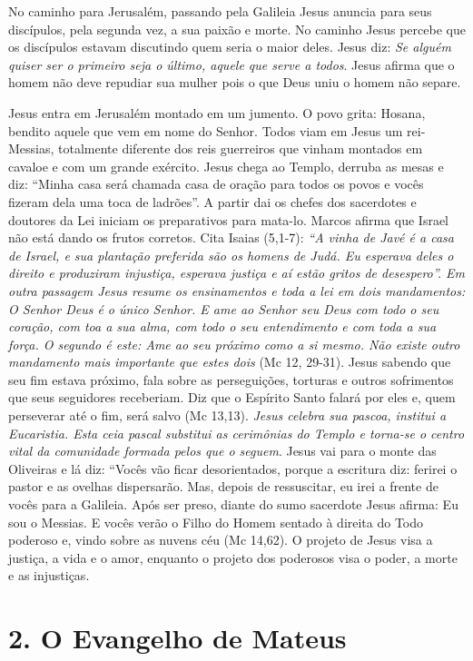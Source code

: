 \documentclass[
]{book}
\begin{document}
No caminho para Jerusalém, passando pela Galileia Jesus anuncia para seus discípulos, pela segunda vez, a sua paixão e morte. No caminho Jesus percebe que os discípulos estavam discutindo quem seria o maior deles. Jesus diz: \emph{Se alguém quiser ser o primeiro seja o último, aquele que serve a todos}. Jesus afirma que o homem não deve repudiar sua mulher pois o que Deus uniu o homem não separe.

Jesus entra em Jerusalém montado em um jumento. O povo grita: Hosana, bendito aquele que vem em nome do Senhor. Todos viam em Jesus um rei-Messias, totalmente diferente dos reis guerreiros que vinham montados em cavaloe e com um grande exército. Jesus chega ao Templo, derruba as mesas e diz: ``Minha casa será chamada casa de oração para todos os povos e vocês fizeram dela uma toca de ladrões''. A partir dai os chefes dos sacerdotes e doutores da Lei iniciam os preparativos para mata-lo. Marcos afirma que Israel não está dando os frutos corretos. Cita Isaias (5,1-7): \emph{``A vinha de Javé é a casa de Israel, e sua plantação preferida são os homens de Judá. Eu esperava deles o direito e produziram injustiça, esperava justiça e aí estão gritos de desespero''. Em outra passagem Jesus resume os ensinamentos e toda a lei em dois mandamentos: O Senhor Deus é o único Senhor. E ame ao Senhor seu Deus com todo o seu coração, com toa a sua alma, com todo o seu entendimento e com toda a sua força. O segundo é este: Ame ao seu próximo como a si mesmo. Não existe outro mandamento mais importante que estes dois} (Mc 12, 29-31). Jesus sabendo que seu fim estava próximo, fala sobre as perseguições, torturas e outros sofrimentos que seus seguidores receberiam. Diz que o Espírito Santo falará por eles e, quem perseverar até o fim, será salvo (Mc 13,13). \emph{Jesus celebra sua pascoa, institui a Eucaristia. Esta ceia pascal substitui as cerimônias do Templo e torna-se o centro vital da comunidade formada pelos que o seguem}. Jesus vai para o monte das Oliveiras e lá diz: ``Vocês vão ficar desorientados, porque a escritura diz: ferirei o pastor e as ovelhas dispersarão. Mas, depois de ressuscitar, eu irei a frente de vocês para a Galileia. Após ser preso, diante do sumo sacerdote Jesus afirma: Eu sou o Messias. E vocês verão o Filho do Homem sentado à direita do Todo poderoso e, vindo sobre as nuvens céu (Mc 14,62). O projeto de Jesus visa a justiça, a vida e o amor, enquanto o projeto dos poderosos visa o poder, a morte e as injustiças.

\hypertarget{o-evangelho-de-mateus}{%
\section*{2. O Evangelho de Mateus}\label{o-evangelho-de-mateus}}
\end{document}
